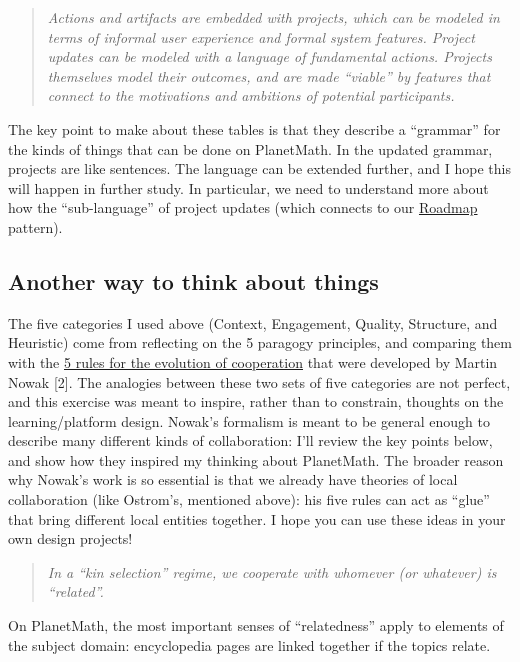 \begin{quote}
\emph{Actions and artifacts are embedded with projects, which can be
modeled in terms of informal user experience and formal system features.
Project updates can be modeled with a language of fundamental actions.
Projects themselves model their outcomes, and are made ``viable'' by
features that connect to the motivations and ambitions of potential
participants.}
\end{quote}
The key point to make about these tables is that they describe a
``grammar'' for the kinds of things that can be done on PlanetMath. In
the updated grammar, projects are like sentences. The language can be
extended further, and I hope this will happen in further study. In
particular, we need to understand more about how the ``sub-language'' of
project updates (which connects to our
\href{http://peeragogy.org/practice/roadmap/}{Roadmap} pattern).

\subsection{Another way to think about things}

The five categories I used above (Context, Engagement, Quality,
Structure, and Heuristic) come from reflecting on the 5 paragogy
principles, and comparing them with the
\href{http://isites.harvard.edu/fs/docs/icb.topic426436.files/five\_rules.pdf}{5
rules for the evolution of cooperation} that were developed by Martin
Nowak {[}2{]}. The analogies between these two sets of five categories
are not perfect, and this exercise was meant to inspire, rather than to
constrain, thoughts on the learning/platform design. Nowak's formalism
is meant to be general enough to describe many different kinds of
collaboration: I'll review the key points below, and show how they
inspired my thinking about PlanetMath. The broader reason why Nowak's
work is so essential is that we already have theories of local
collaboration (like Ostrom's, mentioned above): his five rules can act
as ``glue'' that bring different local entities together. I hope you can
use these ideas in your own design projects!

\begin{quote}
\emph{In a ``kin selection'' regime, we cooperate with whomever (or
whatever) is ``related''.}
\end{quote}
On PlanetMath, the most important senses of ``relatedness'' apply to
elements of the subject domain: encyclopedia pages are linked together
if the topics relate.

